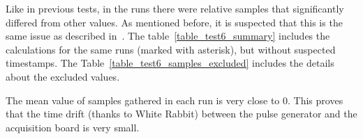 \documentclass[a4paper, 12pt]{article}
\begin{document}

Like in previous tests, in the runs there were relative samples that
significantly differed from other values.
As mentioned before, it is suspected that this is the same issue
as described in~\cite{tdc_perf_test}.
The table~\ref{table_test6_summary}
includes the calculations for the same runs (marked with asterisk),
but without suspected timestamps. The Table~\ref{table_test6_samples_excluded}
includes the details about the excluded values.


The mean value of samples gathered in each run is very close to 0.
This proves that the time drift (thanks to White Rabbit) between
the pulse generator and the acquisition board is very small.
\end{document}
